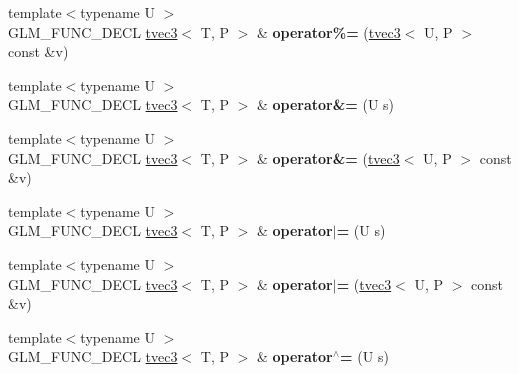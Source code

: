 \begin{DoxyCompactItemize}
\item 
{\footnotesize template$<$typename U $>$ }\\G\+L\+M\+\_\+\+F\+U\+N\+C\+\_\+\+D\+E\+CL \hyperlink{structglm_1_1detail_1_1tvec3}{tvec3}$<$ T, P $>$ \& {\bfseries operator\%=} (\hyperlink{structglm_1_1detail_1_1tvec3}{tvec3}$<$ U, P $>$ const \&v)\hypertarget{structglm_1_1detail_1_1tvec3_ad99c15901cce70147d1264b4ee5f57fd}{}\label{structglm_1_1detail_1_1tvec3_ad99c15901cce70147d1264b4ee5f57fd}

\item 
{\footnotesize template$<$typename U $>$ }\\G\+L\+M\+\_\+\+F\+U\+N\+C\+\_\+\+D\+E\+CL \hyperlink{structglm_1_1detail_1_1tvec3}{tvec3}$<$ T, P $>$ \& {\bfseries operator\&=} (U s)\hypertarget{structglm_1_1detail_1_1tvec3_a295867db452780e8c812175b0b3eb2be}{}\label{structglm_1_1detail_1_1tvec3_a295867db452780e8c812175b0b3eb2be}

\item 
{\footnotesize template$<$typename U $>$ }\\G\+L\+M\+\_\+\+F\+U\+N\+C\+\_\+\+D\+E\+CL \hyperlink{structglm_1_1detail_1_1tvec3}{tvec3}$<$ T, P $>$ \& {\bfseries operator\&=} (\hyperlink{structglm_1_1detail_1_1tvec3}{tvec3}$<$ U, P $>$ const \&v)\hypertarget{structglm_1_1detail_1_1tvec3_ab39bbc25edd4ae5ac2685c5354eb7a2d}{}\label{structglm_1_1detail_1_1tvec3_ab39bbc25edd4ae5ac2685c5354eb7a2d}

\item 
{\footnotesize template$<$typename U $>$ }\\G\+L\+M\+\_\+\+F\+U\+N\+C\+\_\+\+D\+E\+CL \hyperlink{structglm_1_1detail_1_1tvec3}{tvec3}$<$ T, P $>$ \& {\bfseries operator$\vert$=} (U s)\hypertarget{structglm_1_1detail_1_1tvec3_a818c3ac164bed3ed6eda1842e3d23190}{}\label{structglm_1_1detail_1_1tvec3_a818c3ac164bed3ed6eda1842e3d23190}

\item 
{\footnotesize template$<$typename U $>$ }\\G\+L\+M\+\_\+\+F\+U\+N\+C\+\_\+\+D\+E\+CL \hyperlink{structglm_1_1detail_1_1tvec3}{tvec3}$<$ T, P $>$ \& {\bfseries operator$\vert$=} (\hyperlink{structglm_1_1detail_1_1tvec3}{tvec3}$<$ U, P $>$ const \&v)\hypertarget{structglm_1_1detail_1_1tvec3_a605cec2d55f9419c2135027f4cd80a22}{}\label{structglm_1_1detail_1_1tvec3_a605cec2d55f9419c2135027f4cd80a22}

\item 
{\footnotesize template$<$typename U $>$ }\\G\+L\+M\+\_\+\+F\+U\+N\+C\+\_\+\+D\+E\+CL \hyperlink{structglm_1_1detail_1_1tvec3}{tvec3}$<$ T, P $>$ \& {\bfseries operator$^\wedge$=} (U s)\hypertarget{structglm_1_1detail_1_1tvec3_a5485429a19dda771abed1aaa2784d999}{}\label{structglm_1_1detail_1_1tvec3_a5485429a19dda771abed1aaa2784d999}


\end{DoxyCompactItemize}
